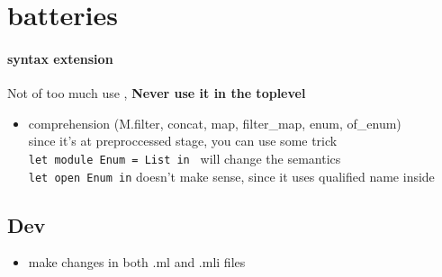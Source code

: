 \section{batteries}
\paragraph{syntax extension}

Not of too much use , \textbf{Never use it in the toplevel}
\begin{itemize}
\item comprehension (M.filter, concat, map, filter\_map, enum, of\_enum) \\
  since it's at preproccessed stage, you can use some trick \\
  \verb|let module Enum = List in | will change the semantics \\
  \verb|let open Enum in| doesn't make sense, since it uses qualified name inside
\end{itemize}
\subsection{Dev}
\begin{itemize}
\item make changes in both .ml and .mli files
\end{itemize}

